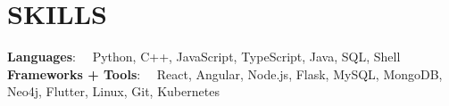 \documentclass[letterpaper,11pt]{article}
\begin{document}
\section{SKILLS}
  \vspace{-4pt} 
  \begin{itemize}[leftmargin=0in, label={}]
    \small{\item{
     \textbf{\hspace{13.77mm}  Languages}{: \ \ Python, C++, JavaScript, TypeScript, Java, SQL, Shell} \\
     \textbf{Frameworks + Tools}{: \ \ React, Angular, Node.js, Flask, MySQL, MongoDB, Neo4j, Flutter, Linux, Git, Kubernetes}}}
 \end{itemize}

\end{document}
